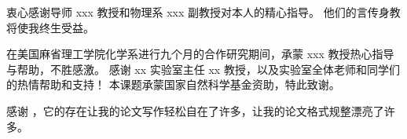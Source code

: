 衷心感谢导师 xxx 教授和物理系 xxx 副教授对本人的精心指导。
他们的言传身教将使我终生受益。

在美国麻省理工学院化学系进行九个月的合作研究期间，承蒙 xxx 教授热心指导与帮助，不胜感激。
感谢 xx 实验室主任 xx 教授，以及实验室全体老师和同学们的热情帮助和支持！
本课题承蒙国家自然科学基金资助，特此致谢。

感谢 \tongjithesis{}，它的存在让我的论文写作轻松自在了许多，让我的论文格式规整漂亮了许多。